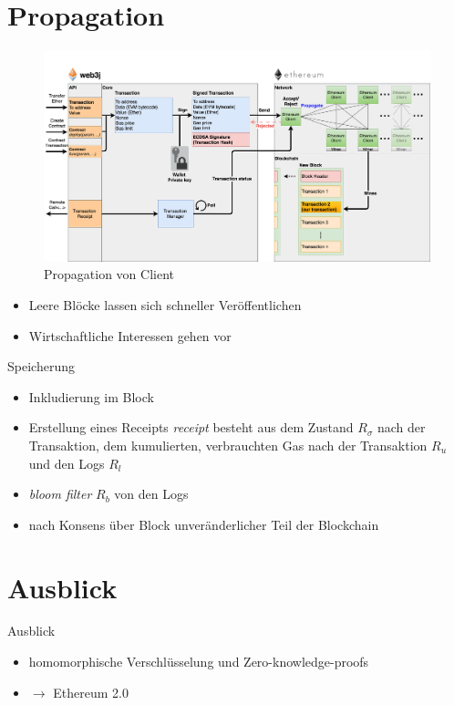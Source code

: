 \documentclass{f4_beamer}
\begin{document}
\section{Propagation}
\begin{frame}{}
  \begin{figure}[h!]
    \centerline{\includegraphics[width=\textwidth, keepaspectratio]{web3j_transaction.png}}
    \caption{Propagation von Client \cite{noauthor_web3j_transactionpng_nodate}}
    \label{blocks_transactions_per_block}
  \end{figure}
  \begin{itemize}
    \item Leere Blöcke lassen sich schneller Veröffentlichen
    \item Wirtschaftliche Interessen gehen vor 
  \end{itemize}
\end{frame}
\begin{frame}{Speicherung}
  \begin{itemize}
    \item Inkludierung im Block
    \item Erstellung eines Receipts \textit{receipt} besteht aus dem Zustand $ R_{\sigma} $ nach der Transaktion, dem kumulierten, verbrauchten Gas nach der Transaktion $ R_u $ und den Logs $ R_l $
    \item \textit{bloom filter} $ R_b $ von den Logs
    \item nach Konsens über Block unveränderlicher Teil der Blockchain
  \end{itemize}
\end{frame}
\section{Ausblick}
\begin{frame}{Ausblick}
  \begin{itemize}
    \item homomorphische Verschlüsselung und Zero-knowledge-proofs
    \item $\rightarrow$ Ethereum 2.0
  \end{itemize}
\end{frame}




\end{document}
